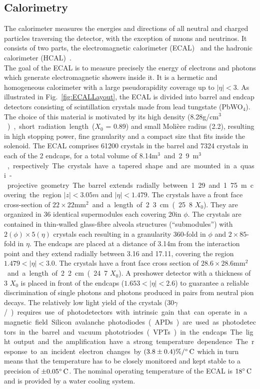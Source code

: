 \subsection{Calorimetry}

The calorimeter measures the energies and directions of all neutral and charged particles traversing the detector, with the exception of muons and neutrinos. It consists of two parts, the
electromagnetic calorimeter (ECAL)~\cite{ECALtdr} and the hadronic calorimeter (HCAL)~\cite{HCALtdr}.\\

The goal of the ECAL is to measure precisely the energy of electrons and photons which generate electromagnetic showers inside it. It is a hermetic and homogeneous calorimeter with a large pseudorapidity coverage up to $|\eta| < 3$. As illustrated in Fig.~\ref{fig:ECALLayout}, the ECAL is divided into barrel and endcap detectors consisting of scintillation crystals made from lead tungstate (PbWO$_4$). The choice of this material is motivated by its high density (8.28\unit{g/cm$^3$} ), short radiation length ($X_0$ = 0.89\cm) and small Moli\`{e}re radius (2.2\cm), resulting in high stopping power, fine granularity and a compact size that fits inside the solenoid.
The ECAL comprises 61200 crystals in the barrel and 7324 crystals in each of the 2 endcaps, for a total volume of 8.14\unit{m$^3$} and 2.9\unit{m$^3$}, respectively. The crystals have a tapered shape and are mounted in a quasi-projective geometry.
The barrel extends radially between 1.29 and 1.75\unit{m} covering the region $|z| < 3.05\unit{m}$ and $|\eta| < 1.479$. The crystals have a front face cross-section of $22\times22$\unit{mm$^2$} and a length of 2.3\cm (25.8 $X_0$). They are organized in 36 identical supermodules each covering 20\de in $\phi$. The crystals are contained in thin-walled glass-fibre alveola structures (``submodules'') with $2(\phi)\times5(\eta)$ crystals each resulting in a granularity 360-fold in $\phi$ and $2\times85$-fold in $\eta$. The endcaps are placed at a distance of 3.14\unit{m} from the interaction point and they extend radially between 3.16 and 17.11\cm, covering the region $1.479 < |\eta| < 3.0$. The crystals have a front face cross section of $28.6\times28.6$\unit{mm$^2$} and a length of 2.2\cm (24.7 $X_0$). A preshower detector with a thickness of 3 $X_0$ is placed in front of the endcaps ($1.653 < |\eta| < 2.6$) to guarantee a reliable discrimination of single photons and photons produced in pairs from neutral pion decays.
The relatively low light yield of the crystals (30\unit{$\gamma$/\MeV}) requires use of photodetectors with intrinsic gain that can operate in a magnetic field. Silicon avalanche photodiodes (APDs) are used as photodetectors in the barrel and vacuum phototriodes (VPTs) in the endcaps. The light output and the amplification have a strong temperature dependence. The response to an incident electron changes by $(3.8\pm0.4)\%/^\circ\text{\,C}$ which in turn means that the temperature has to be closely monitored and kept stable to a precision of $\pm0.05^\circ\text{\,C}$. The nominal operating temperature of the ECAL is $18^\circ\text{\,C}$ and is provided by a water cooling system.

